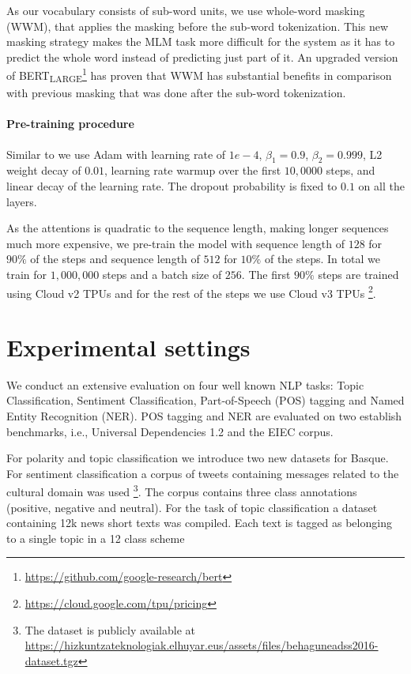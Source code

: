 \documentclass[10pt, a4paper]{article}
\begin{document}
As our vocabulary consists of sub-word units, we use whole-word masking (WWM), that applies the masking before the sub-word tokenization. This new masking strategy makes the MLM task more difficult for the system as it has to predict the whole word instead of predicting just part of it. An upgraded version of BERT\textsubscript{LARGE}\footnote{\url{https://github.com/google-research/bert}} has proven that WWM has substantial benefits in comparison with previous masking that was done after the sub-word tokenization. 

\paragraph{Pre-training procedure}

Similar to \cite{devlin2019bert} we use Adam with learning rate of $1e-4$, $\beta_1=0.9$, $\beta_2=0.999$, L2 weight decay of $0.01$, learning rate warmup over the first $10,0000$ steps, and linear decay of the learning rate. The dropout probability is fixed to $0.1$ on all the layers. 

As the attentions is quadratic to the sequence length, making longer sequences much more expensive, we pre-train the model with sequence length of $128$ for $90\%$ of the steps and sequence length of $512$ for $10\%$ of the steps. In total we train for $1,000,000$ steps and a batch size of $256$. The first $90\%$ steps are trained using Cloud v2 TPUs and for the rest of the steps we use Cloud v3 TPUs \footnote{\url{https://cloud.google.com/tpu/pricing}}. 

\section{Experimental settings}\label{sec:exper-sett}



We conduct an extensive evaluation on four well known NLP tasks: Topic Classification, Sentiment Classification, Part-of-Speech (POS) tagging and Named Entity Recognition (NER). POS tagging and NER are evaluated on two establish benchmarks, i.e., Universal Dependencies 1.2 and the EIEC corpus.

For polarity and topic classification we introduce two new datasets for Basque. For sentiment classification a corpus of tweets containing messages related to the cultural domain was used \cite{san2019multilingual}\footnote{The dataset is publicly available at \url{https://hizkuntzateknologiak.elhuyar.eus/assets/files/behaguneadss2016-dataset.tgz}}. The corpus contains three class annotations (positive, negative and neutral). For the task of topic classification a dataset containing 12k news short texts was compiled. Each text is tagged as belonging to a single topic in a 12 class scheme
\end{document}
